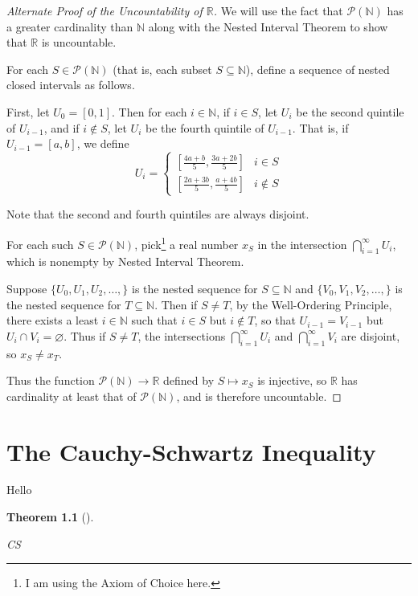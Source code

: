 \documentclass[
  letterpaper,
  DIV=11,
  numbers=noendperiod]{scrreprt}
\def\R{\mathbb R}
\def\N{\mathbb N}
\theoremstyle{plain}
\newtheorem{theorem}{Theorem}[chapter]
\theoremstyle{definition}
\theoremstyle{plain}
\theoremstyle{plain}
\theoremstyle{definition}
\theoremstyle{definition}
\theoremstyle{remark}
\begin{document}
\begin{proof}[Alternate Proof of the Uncountability of \(\R\)]
We will use the fact that \(\mathcal P(\N)\) has a greater cardinality
than \(\N\) along with the Nested Interval Theorem to show that \(\R\)
is uncountable.

For each \(S\in\mathcal P(\N)\) (that is, each subset \(S\subseteq\N\)),
define a sequence of nested closed intervals as follows.

First, let \(U_0=[0,1]\). Then for each \(i\in\N\), if \(i\in S\), let
\(U_i\) be the second quintile of \(U_{i-1}\), and if \(i\notin S\), let
\(U_i\) be the fourth quintile of \(U_{i-1}\). That is, if
\(U_{i-1}=[a,b]\), we define
\[U_i=\begin{cases} \left[\frac{4a+b}{5},\frac{3a+2b}{5}\right] & i\in S \\ \left[\frac{2a+3b}{5},\frac{a+4b}{5}\right] & i\notin S \end{cases}\]

Note that the second and fourth quintiles are always disjoint.

For each such \(S\in\mathcal P(\N)\), pick\footnote{I am using the Axiom
  of Choice here.} a real number \(x_S\) in the intersection
\(\bigcap_{i=1}^\infty U_i\), which is nonempty by Nested Interval
Theorem.

Suppose \(\{U_0,U_1,U_2,\ldots,\}\) is the nested sequence for
\(S\subseteq\N\) and \(\{V_0,V_1,V_2,\ldots,\}\) is the nested sequence
for \(T\subseteq\N\). Then if \(S\neq T\), by the Well-Ordering
Principle, there exists a least \(i\in\N\) such that \(i\in S\) but
\(i\notin T\), so that \(U_{i-1}=V_{i-1}\) but
\(U_i\cap V_i=\varnothing\). Thus if \(S\neq T\), the intersections
\(\bigcap_{i=1}^\infty U_i\) and \(\bigcap_{i=1}^\infty V_i\) are
disjoint, so \(x_S\neq x_T\).

Thus the function \(\mathcal P(\N)\rightarrow\R\) defined by
\(S\mapsto x_S\) is injective, so \(\R\) has cardinality at least that
of \(\mathcal P(\N)\), and is therefore uncountable.
\end{proof}

\chapter{The Cauchy-Schwartz Inequality}\label{sec-cauchy-schwartz}

Hello

\begin{theorem}[]\protect\hypertarget{thm-cauchy-schwartz}{}\label{thm-cauchy-schwartz}

CS

\end{theorem}
\end{document}
